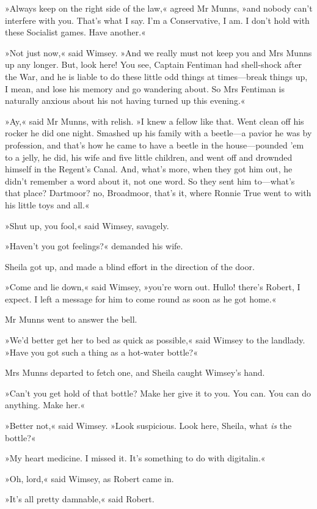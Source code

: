 »Always keep on the right side of the law,« agreed Mr Munns, »and nobody can't interfere with you. That's what I say. I'm a Conservative, I am. I don't hold with these Socialist games. Have another.«

»Not just now,« said Wimsey. »And we really must not keep you and Mrs Munns up any longer. But, look here! You see, Captain Fentiman had shell-shock after the War, and he is liable to do these little odd things at times—break things up, I mean, and lose his memory and go wandering about. So Mrs Fentiman is naturally anxious about his not having turned up this evening.«

»Ay,« said Mr Munns, with relish. »I knew a fellow like that. Went clean off his rocker he did one night. Smashed up his family with a beetle—a pavior he was by profession, and that's how he came to have a beetle in the house—pounded 'em to a jelly, he did, his wife and five little children, and went off and drownded himself in the Regent's Canal. And, what's more, when they got him out, he didn't remember a word about it, not one word. So they sent him to—what's that place? Dartmoor? no, Broadmoor, that's it, where Ronnie True went to with his little toys and all.«

»Shut up, you fool,« said Wimsey, savagely.

»Haven't you got feelings?« demanded his wife.

Sheila got up, and made a blind effort in the direction of the door.

»Come and lie down,« said Wimsey, »you're worn out. Hullo! there's Robert, I expect. I left a message for him to come round as soon as he got home.«

Mr Munns went to answer the bell.

»We'd better get her to bed as quick as possible,« said Wimsey to the landlady. »Have you got such a thing as a hot-water bottle?«

Mrs Munns departed to fetch one, and Sheila caught Wimsey's hand.

»Can't you get hold of that bottle? Make her give it to you. You can. You can do anything. Make her.«

»Better not,« said Wimsey. »Look suspicious. Look here, Sheila, what \textit{is} the bottle?«

»My heart medicine. I missed it. It's something to do with digitalin.«

»Oh, lord,« said Wimsey, as Robert came in.

»It's all pretty damnable,« said Robert.

